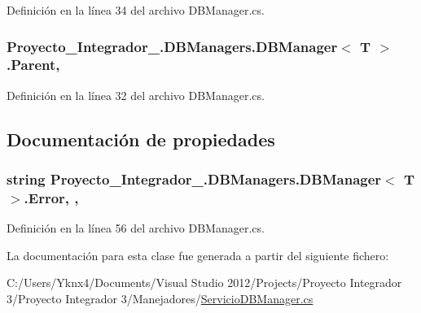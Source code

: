 Definición en la línea 34 del archivo D\-B\-Manager.\-cs.

\hypertarget{class_proyecto___integrador__3_1_1_d_b_managers_1_1_d_b_manager_3_01_t_01_4_a06315e75298c8f2fd46f32dc7c9a80b2}{
\subsubsection[{Parent}]{ Proyecto\-\_\-\-Integrador\-\_.\-D\-B\-Managers.\-D\-B\-Manager$<$ T $>$.Parent\hspace{0.3cm}{\ttfamily [protected]}, {\ttfamily [inherited]}}}\label{class_proyecto___integrador__3_1_1_d_b_managers_1_1_d_b_manager_3_01_t_01_4_a06315e75298c8f2fd46f32dc7c9a80b2}


Definición en la línea 32 del archivo D\-B\-Manager.\-cs.



\subsection{Documentación de propiedades}
\hypertarget{class_proyecto___integrador__3_1_1_d_b_managers_1_1_d_b_manager_3_01_t_01_4_a6e5caaed2ee1a4d067dfbf5aaa1b1fa8}{
\subsubsection[{Error}]{\setlength{\rightskip}{0pt plus 5cm}string Proyecto\-\_\-\-Integrador\-\_.\-D\-B\-Managers.\-D\-B\-Manager$<$ T $>$.Error\hspace{0.3cm}{\ttfamily [get]}, {\ttfamily [set]}, {\ttfamily [inherited]}}}\label{class_proyecto___integrador__3_1_1_d_b_managers_1_1_d_b_manager_3_01_t_01_4_a6e5caaed2ee1a4d067dfbf5aaa1b1fa8}


Definición en la línea 56 del archivo D\-B\-Manager.\-cs.



La documentación para esta clase fue generada a partir del siguiente fichero\-:\begin{DoxyCompactItemize}
\item 
C\-:/\-Users/\-Yknx4/\-Documents/\-Visual Studio 2012/\-Projects/\-Proyecto Integrador 3/\-Proyecto Integrador 3/\-Manejadores/\hyperlink{_servicio_d_b_manager_8cs}{Servicio\-D\-B\-Manager.\-cs}\end{DoxyCompactItemize}
